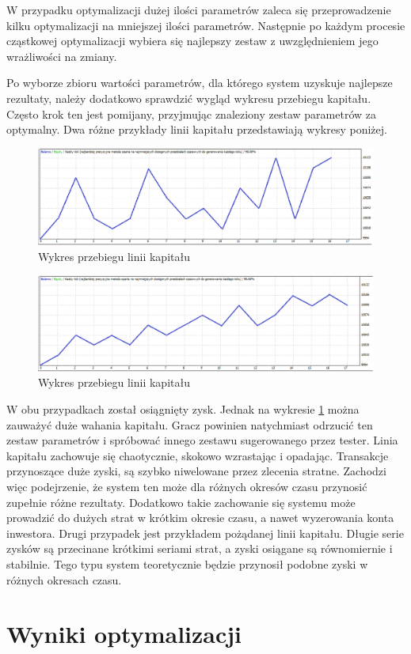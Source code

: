 \documentclass[pdflatex,11pt]{aghdpl}
\begin{document}
W przypadku optymalizacji dużej ilości parametrów zaleca się przeprowadzenie kilku optymalizacji na mniejszej ilości parametrów. Następnie po każdym procesie cząstkowej optymalizacji wybiera się najlepszy zestaw z uwzględnieniem jego wrażliwości na zmiany.
 
Po wyborze zbioru wartości parametrów, dla którego system uzyskuje najlepsze rezultaty, należy dodatkowo sprawdzić wygląd wykresu przebiegu kapitału. Często krok ten jest pomijany, przyjmując znaleziony zestaw parametrów za optymalny. Dwa różne przykłady linii kapitału przedstawiają wykresy poniżej.
\begin{figure}[h!]
\begin{center}
\includegraphics[width=12cm]{optymalizacja_zla.png}
\caption{Wykres przebiegu linii kapitału}
\label{liniakapzla}
\end{center}
\end{figure} 
\begin{figure}[h!]
\begin{center}
\includegraphics[width=12cm]{optymalizacja_dobra.png}
\caption{Wykres przebiegu linii kapitału}
\label{liniakapdobra}
\end{center}
\end{figure} 
W obu przypadkach został osiągnięty zysk. Jednak na wykresie \ref{liniakapzla} można zauważyć duże wahania kapitału. Gracz powinien natychmiast odrzucić ten zestaw parametrów i spróbować innego zestawu sugerowanego przez tester. Linia kapitału zachowuje się chaotycznie, skokowo wzrastając i opadając. Transakcje przynoszące duże zyski, są szybko niwelowane przez zlecenia stratne. Zachodzi więc podejrzenie, że system ten może dla różnych okresów czasu przynosić zupełnie różne rezultaty. Dodatkowo takie zachowanie się systemu może prowadzić do dużych strat w krótkim okresie czasu, a nawet wyzerowania konta inwestora. Drugi przypadek jest przykładem pożądanej linii kapitału. Długie serie zysków są przecinane krótkimi seriami strat, a zyski osiągane są równomiernie i stabilnie. Tego typu system teoretycznie będzie przynosił podobne zyski w różnych okresach czasu.

\section{Wyniki optymalizacji}
\paragraph{}



% 
% 



\end{document}
